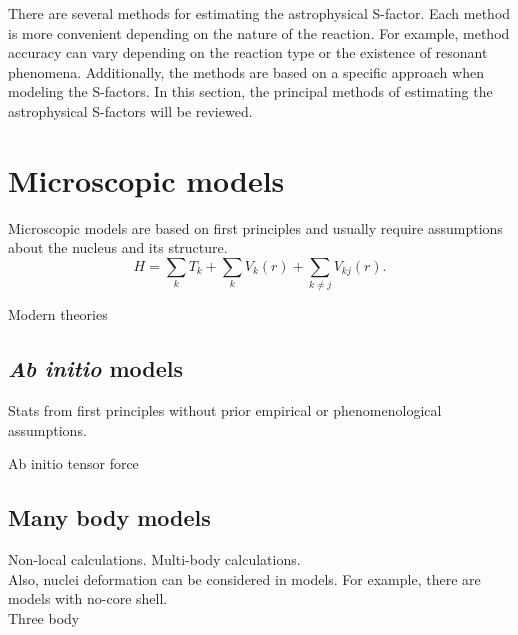 \documentclass[openany]{book}
\begin{document}
There are several methods for estimating the astrophysical S-factor. Each method is more convenient depending on the nature of the reaction. For example, method accuracy can vary depending on  the reaction type or the existence of resonant phenomena. Additionally, the methods are based on a specific approach when modeling the S-factors. In this section, the principal methods of estimating the astrophysical S-factors will be reviewed.

\section{Microscopic models} \label{sec:microscopicalModels}

Microscopic models are based on first principles and usually require assumptions about the nucleus and its structure. \\ 

\begin{equation} \label{eq:micro_hamiltonian}
	H = \sum_{k} T_k + \sum_{k} V_k (r) + \sum_{k \neq j} V_{kj}(r).
\end{equation}

Modern theories \cite{marcucci_nollett_schiavilla_wiringa_2006}

\subsection{\textit{Ab initio} models} \label{sub:microscopical_abinitio}

Stats from first principles without prior empirical or phenomenological assumptions.

Ab initio \cite{neff_feldmeier_langanke_2011}
\cite{navratil_quaglioni_hupin_romero-redondo_calci_2016}
\cite{navratil_bertulani_caurier_2006}
\cite{atkinson_navratil_hupin_kravvaris_quaglioni_2022}
tensor force \cite{arai_aoyama_suzuki_descouvemont_baye_2013}


\subsection{Many body models}  \label{sub:microscopical_manybody}
Non-local calculations. Multi-body calculations. \\

Also, nuclei deformation can be considered in models. For example, there are models with no-core shell. \\

Three body \cite{grigorenko_danilin_efros_shulgina_zhukov_1998}
\end{document}
